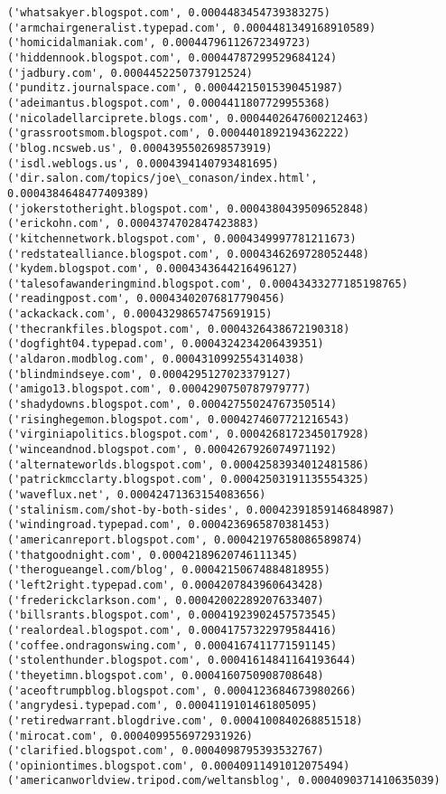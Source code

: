 \documentclass[11pt]{article}
\begin{document}
\begin{Verbatim}[commandchars=\\\{\}]
('whatsakyer.blogspot.com', 0.0004483454739383275)
('armchairgeneralist.typepad.com', 0.0004481349168910589)
('homicidalmaniak.com', 0.00044796112672349723)
('hiddennook.blogspot.com', 0.00044787299529684124)
('jadbury.com', 0.0004452250737912524)
('punditz.journalspace.com', 0.00044215015390451987)
('adeimantus.blogspot.com', 0.0004411807729955368)
('nicoladellarciprete.blogs.com', 0.0004402647600212463)
('grassrootsmom.blogspot.com', 0.0004401892194362222)
('blog.ncsweb.us', 0.0004395502698573919)
('isdl.weblogs.us', 0.0004394140793481695)
('dir.salon.com/topics/joe\_conason/index.html', 0.0004384648477409389)
('jokerstotheright.blogspot.com', 0.0004380439509652848)
('erickohn.com', 0.0004374702847423883)
('kitchennetwork.blogspot.com', 0.0004349997781211673)
('redstatealliance.blogspot.com', 0.0004346269728052448)
('kydem.blogspot.com', 0.0004343644216496127)
('talesofawanderingmind.blogspot.com', 0.00043433277185198765)
('readingpost.com', 0.00043402076817790456)
('ackackack.com', 0.00043298657475691915)
('thecrankfiles.blogspot.com', 0.0004326438672190318)
('dogfight04.typepad.com', 0.0004324234206439351)
('aldaron.modblog.com', 0.0004310992554314038)
('blindmindseye.com', 0.0004295127023379127)
('amigo13.blogspot.com', 0.0004290750787979777)
('shadydowns.blogspot.com', 0.00042755024767350514)
('risinghegemon.blogspot.com', 0.0004274607721216543)
('virginiapolitics.blogspot.com', 0.0004268172345017928)
('winceandnod.blogspot.com', 0.0004267926074971192)
('alternateworlds.blogspot.com', 0.00042583934012481586)
('patrickmcclarty.blogspot.com', 0.00042503191135554325)
('waveflux.net', 0.00042471363154083656)
('stalinism.com/shot-by-both-sides', 0.00042391859146848987)
('windingroad.typepad.com', 0.0004236965870381453)
('americanreport.blogspot.com', 0.00042197658086589874)
('thatgoodnight.com', 0.00042189620746111345)
('therogueangel.com/blog', 0.00042150674884818955)
('left2right.typepad.com', 0.0004207843960643428)
('frederickclarkson.com', 0.00042002289207633407)
('billsrants.blogspot.com', 0.00041923902457573545)
('realordeal.blogspot.com', 0.00041757322979584416)
('coffee.ondragonswing.com', 0.0004167411771591145)
('stolenthunder.blogspot.com', 0.00041614841164193644)
('theyetimn.blogspot.com', 0.0004160750908708648)
('aceoftrumpblog.blogspot.com', 0.0004123684673980266)
('angrydesi.typepad.com', 0.0004119101461805095)
('retiredwarrant.blogdrive.com', 0.0004100840268851518)
('mirocat.com', 0.0004099556972931926)
('clarified.blogspot.com', 0.0004098795393532767)
('opiniontimes.blogspot.com', 0.00040911491012075494)
('americanworldview.tripod.com/weltansblog', 0.0004090371410635039)

\end{Verbatim}
\end{document}
